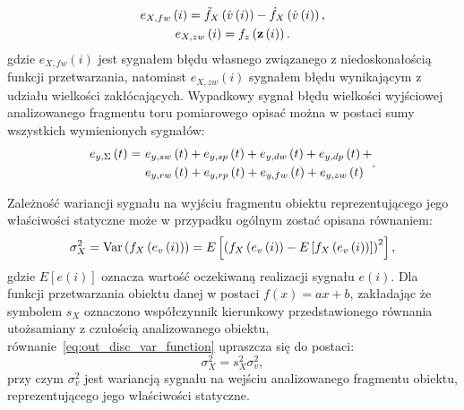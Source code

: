 \begin{gather}
e_{X,fw} \left(i\right) = \tilde{f}_{X} \left( \dot{v} \left(i\right) \right) - \dot{f}_{X} \left( \dot{v} \left(i\right) \right) \label{eq:out_disc_err_funct_self}, \\
e_{X,zw} \left(i\right) = f_{z} \left(\mathbf{z} \left(i\right)\right) \label{eq:out_disc_err_env_self}.
\end{gather}
gdzie $e_{X,fw}(i)$ jest sygnałem błędu własnego związanego z niedoskonałością funkcji przetwarzania, natomiast $e_{X,zw}(i)$ sygnałem błędu wynikającym z udziału wielkości zakłócających. Wypadkowy sygnał błędu wielkości wyjściowej analizowanego fragmentu toru pomiarowego opisać można w postaci sumy wszystkich wymienionych sygnałów:
\begin{equation}
\begin{split}
e_{y,\Sigma} \left(t\right) =~
& e_{y,sw} \left(t\right) + e_{y,sp} \left(t\right) + e_{y,dw} \left(t\right) + e_{y,dp} \left(t\right) + \\
& e_{y,rw} \left(t\right) + e_{y,rp} \left(t\right) + e_{y,fw} \left(t\right) + e_{y,zw} \left(t\right)
\end{split}
\label{eq:out_disc_err_sum_all}.
\end{equation}

Zależność wariancji sygnału na wyjściu fragmentu obiektu reprezentującego jego właściwości statyczne może w przypadku ogólnym zostać opisana równaniem:
\begin{equation}
\sigma_{X}^{2} = \text{Var}\left(f_{X} \left(e_{v} \left(i\right)\right)\right) = E \left[ \left( f_{X} \left(e_{v} \left(i\right)\right) - E \left[ f_{X} \left(e_{v} \left(i\right)\right) \right] \right)^2 \right] \label{eq:out_disc_var_function},
\end{equation}
gdzie $E[e(i)]$ oznacza wartość oczekiwaną realizacji sygnału $e(i)$. Dla funkcji przetwarzania obiektu danej w postaci $f(x) = ax+b$, zakładając że symbolem $s_{X}$ oznaczono współczynnik kierunkowy przedstawionego równania utożsamiany z czułością analizowanego obiektu, równanie~\eqref{eq:out_disc_var_function} upraszcza się do postaci:
\begin{equation}
\sigma_{X}^{2} = s_{X}^{2} \sigma_{v}^{2} \label{eq:out_disc_var_sense},
\end{equation}
przy czym $\sigma_{v}^{2}$ jest wariancją sygnału na wejściu analizowanego fragmentu obiektu, reprezentującego jego właściwości statyczne.

